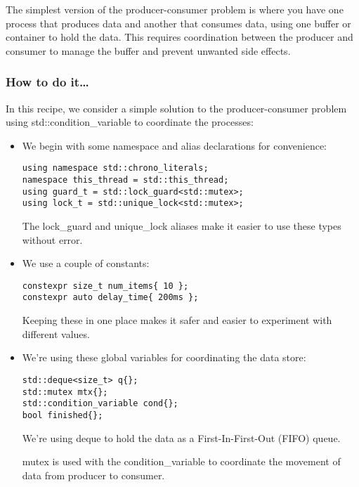 
The simplest version of the producer-consumer problem is where you have one process that produces data and another that consumes data, using one buffer or container to hold the data. This requires coordination between the producer and consumer to manage the buffer and prevent unwanted side effects.

\subsubsection{How to do it…}

In this recipe, we consider a simple solution to the producer-consumer problem using std::condition\_variable to coordinate the processes:

\begin{itemize}
\item 
We begin with some namespace and alias declarations for convenience:

\begin{lstlisting}[style=styleCXX]
using namespace std::chrono_literals;
namespace this_thread = std::this_thread;
using guard_t = std::lock_guard<std::mutex>;
using lock_t = std::unique_lock<std::mutex>;
\end{lstlisting}

The lock\_guard and unique\_lock aliases make it easier to use these types without error.

\item 
We use a couple of constants:

\begin{lstlisting}[style=styleCXX]
constexpr size_t num_items{ 10 };
constexpr auto delay_time{ 200ms };
\end{lstlisting}

Keeping these in one place makes it safer and easier to experiment with different values.

\item 
We're using these global variables for coordinating the data store:

\begin{lstlisting}[style=styleCXX]
std::deque<size_t> q{};
std::mutex mtx{};
std::condition_variable cond{};
bool finished{};
\end{lstlisting}

We're using deque to hold the data as a First-In-First-Out (FIFO) queue.

mutex is used with the condition\_variable to coordinate the movement of data from producer to consumer.


\end{itemize}
